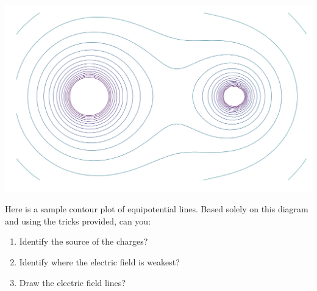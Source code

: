 \begin{center}
\includegraphics[scale=0.7]{Figures/Figure22}
\end{center}

Here is a sample contour plot of equipotential lines. Based solely on this diagram and using the tricks provided, can you:
\begin{enumerate}
    \item Identify the source of the charges?
    \item Identify where the electric field is weakest?
    \item Draw the electric field lines?
\end{enumerate}